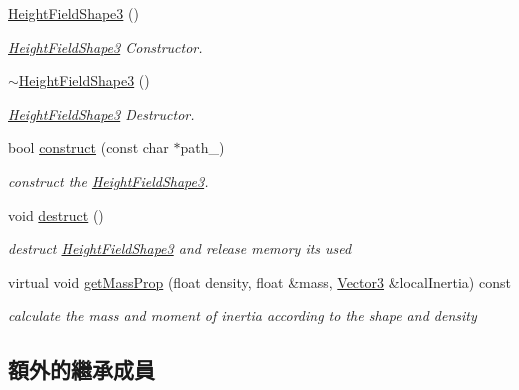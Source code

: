 \begin{DoxyCompactItemize}
\item 
\hyperlink{class_magnum_1_1_height_field_shape3_aae970c34abda857433d744a6998af331}{Height\+Field\+Shape3} ()
\begin{DoxyCompactList}\small\item\em \hyperlink{class_magnum_1_1_height_field_shape3}{Height\+Field\+Shape3} Constructor. \end{DoxyCompactList}\item 
\hyperlink{class_magnum_1_1_height_field_shape3_a2b06078344cebeafd4c0761a809393c4}{$\sim$\+Height\+Field\+Shape3} ()
\begin{DoxyCompactList}\small\item\em \hyperlink{class_magnum_1_1_height_field_shape3}{Height\+Field\+Shape3} Destructor. \end{DoxyCompactList}\item 
bool \hyperlink{class_magnum_1_1_height_field_shape3_a2ef104eadb0ea833564f3d47263c9cb0}{construct} (const char $\ast$path\+\_\+)
\begin{DoxyCompactList}\small\item\em construct the \hyperlink{class_magnum_1_1_height_field_shape3}{Height\+Field\+Shape3}. \end{DoxyCompactList}\item 
void \hyperlink{class_magnum_1_1_height_field_shape3_a1d4b629093852f99e61bb98ff2d18df6}{destruct} ()\hypertarget{class_magnum_1_1_height_field_shape3_a1d4b629093852f99e61bb98ff2d18df6}{}\label{class_magnum_1_1_height_field_shape3_a1d4b629093852f99e61bb98ff2d18df6}

\begin{DoxyCompactList}\small\item\em destruct \hyperlink{class_magnum_1_1_height_field_shape3}{Height\+Field\+Shape3} and release memory its used \end{DoxyCompactList}\item 
virtual void \hyperlink{class_magnum_1_1_height_field_shape3_acc884a1757a1873353c679403939361b}{get\+Mass\+Prop} (float density, float \&mass, \hyperlink{class_magnum_1_1_vector3}{Vector3} \&local\+Inertia) const 
\begin{DoxyCompactList}\small\item\em calculate the mass and moment of inertia according to the shape and density \end{DoxyCompactList}\end{DoxyCompactItemize}
\subsection*{額外的繼承成員}



